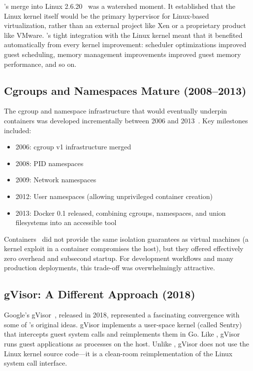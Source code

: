 \KVM{}'s merge into Linux 2.6.20~\cite{kivity2007} was a watershed moment.
It established that the Linux kernel itself would be the primary hypervisor
for Linux-based virtualization, rather than an external project like Xen or
a proprietary product like VMware.  \KVM{}'s tight integration with the Linux
kernel meant that it benefited automatically from every kernel improvement:
scheduler optimizations improved guest scheduling, memory management
improvements improved guest memory performance, and so on.

\subsection{Cgroups and Namespaces Mature (2008--2013)}
\label{sec:history-cgroups}

The cgroup and namespace infrastructure that would eventually underpin
containers was developed incrementally between 2006 and 2013~\cite{namespaces}.
Key milestones included:

\begin{itemize}[nosep]
  \item 2006: cgroup v1 infrastructure merged
  \item 2008: PID namespaces
  \item 2009: Network namespaces
  \item 2012: User namespaces (allowing unprivileged container creation)
  \item 2013: Docker 0.1 released, combining cgroups, namespaces, and
    union filesystems into an accessible tool
\end{itemize}

\noindent
Containers~\cite{soltesz2007} did not provide the same isolation guarantees
as virtual machines (a kernel exploit in a container compromises the host),
but they offered effectively zero overhead and subsecond startup.  For
development workflows and many production deployments, this trade-off was
overwhelmingly attractive.

\subsection{gVisor: A Different Approach (2018)}
\label{sec:history-gvisor}

Google's gVisor~\cite{gvisor}, released in 2018, represented a fascinating
convergence with some of \UML{}'s original ideas.  gVisor implements a
user-space kernel (called Sentry) that intercepts guest system calls and
reimplements them in Go.  Like \UML{}, gVisor runs guest applications as
processes on the host.  Unlike \UML{}, gVisor does not use the Linux kernel
source code---it is a clean-room reimplementation of the Linux system call
interface.

